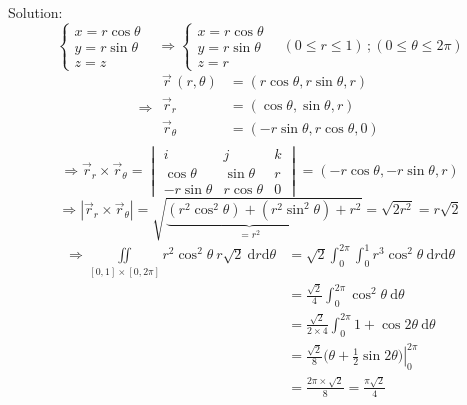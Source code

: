 \documentclass[12pt, fleqn]{book}
\newcommand{\D}{\mathrm{d}}
\begin{document}
	 			Solution:
	 			\begin{equation*}
	 				\begin{cases}
	 					x = r\cos\theta & \\
	 					y = r\sin\theta & \\
	 					z = z
	 				\end{cases}
 				    \Rightarrow
 				    \begin{cases}
	 					x = r\cos\theta & \\
						y = r\sin\theta & \\
						z= r
 				    \end{cases}
 			    	\, (0 \le r \le 1) \, ; (0 \le \theta \le 2\pi) 			    	
	 			\end{equation*}
 				\begin{equation*}
 					\Rightarrow
 					\begin{split}
 						\vec{r}\,(r, \theta) 
 						               & = (r\cos\theta, r\sin\theta, r) \\
 						\vec{r}_r      & = (\cos\theta, \sin\theta, r) \\
 						\vec{r}_\theta & = (-r\sin\theta, r\cos\theta, 0) \\
 					\end{split}
 				\end{equation*}
 				\begin{equation*}
 					\Rightarrow
 					\vec{r}_r \times \vec{r}_\theta = 
 					\begin{vmatrix}
 						i            & j             & k \\
 						\cos\theta   & \sin\theta    & r \\
 						-r\sin\theta & r\cos\theta & 0
 					\end{vmatrix} = (-r\cos\theta, -r\sin\theta, r)
 				\end{equation*}
 				\begin{equation*}
 					\Rightarrow
					\left|\vec{r}_r \times \vec{r}_\theta\right|
         			 = \sqrt{
         			 	\underbrace{
             			 	(r^2\cos^2\theta) +
            			 	(r^2\sin^2\theta)
         		 	    }_{=r^2}
         	 	        + r^2
					 }
					 = \sqrt{2r^2}
					 = r\sqrt{2} 				
 				\end{equation*}
 				\begin{equation*}
 					\begin{split}
	 					\Rightarrow \iint\limits_{[0, 1] \times [0, 2\pi]}
 						r^2\cos^2\theta \ r\sqrt{2} \ \D r \D \theta
 						 & = \sqrt{2} \int_{0}^{2\pi} \int_{0}^{1} r^3\cos^2\theta \ \D r \D \theta \\
 						 & = \frac{\sqrt{2}}{4} \int_{0}^{2\pi} \cos^2\theta \ \D \theta \\
 						 & = \frac{\sqrt{2}}{2 \times 4} \int_{0}^{2\pi} 1 + \cos2\theta \ \D \theta \\
 						 & = \frac{\sqrt{2}}{8} \left.\big(\theta + \frac{1}{2}\sin2\theta\big)\right|_0^{2\pi} \\
 						 & = \frac{2\pi \times \sqrt{2}}{8} = \frac{\pi\sqrt{2}}{4}
 					\end{split}
 				\end{equation*}
\end{document}
